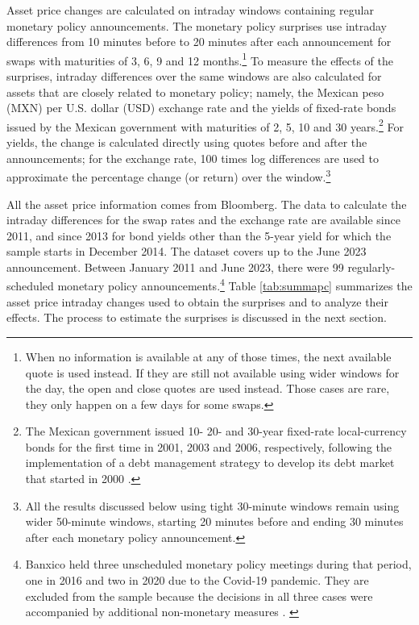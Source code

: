 \documentclass[a4paper, 12pt]{article}
\providecommand{\lastobs}{June 2023}
\begin{document}
Asset price changes are calculated on intraday windows containing regular monetary policy announcements. 
The monetary policy surprises use intraday differences from 10 minutes before to 20 minutes after each announcement for swaps with maturities of 3, 6, 9 and 12 months.\footnote{When no information is available at any of those times, the next available quote is used instead. If they are still not available using wider windows for the day, the open and close quotes are used instead. Those cases are rare, they only happen on a few days for some swaps.} 
To measure the effects of the surprises, intraday differences over the same windows are also calculated for assets that are closely related to monetary policy; namely, the Mexican peso (MXN) per U.S. dollar (USD) exchange rate and the yields of fixed-rate bonds issued by the Mexican government with maturities of  2, 5, 10 and 30 years.\footnote{ The Mexican government issued 10- 20- and 30-year fixed-rate local-currency bonds for the first time in 2001, 2003 and 2006, respectively, following the implementation of a debt management strategy to develop its debt market that started in 2000 \parencite{JeanneauTovar:2008,Banxico:2014}.} 
For yields, the change is calculated directly using quotes before and after the announcements; for the exchange rate, 100 times log differences are used to approximate the percentage change (or return) over the window.\footnote{ All the results discussed below using tight 30-minute windows remain using wider 50-minute windows, starting 20 minutes before and ending 30 minutes after each monetary policy announcement.} 

All the asset price information comes from Bloomberg. 
The data to calculate the intraday differences for the swap rates and the exchange rate are available since 2011, and since 2013 for bond yields other than the 5-year yield for which the sample starts in December 2014. The dataset covers up to the \lastobs{} announcement. 
Between January 2011 and \lastobs, there were 99 regularly-scheduled monetary policy announcements.\footnote{Banxico held three unscheduled monetary policy meetings during that period, one in 2016 and two in 2020 due to the Covid-19 pandemic. They are excluded from the sample because the decisions in all three cases were accompanied by additional non-monetary measures \parencite[see][Appendix B]{Solis:FX}. \label{fn:extrameets}} 
Table \ref{tab:summapc} summarizes the asset price intraday changes used to obtain the surprises and to analyze their effects. The process to estimate the surprises is discussed in the next section.
\end{document}
